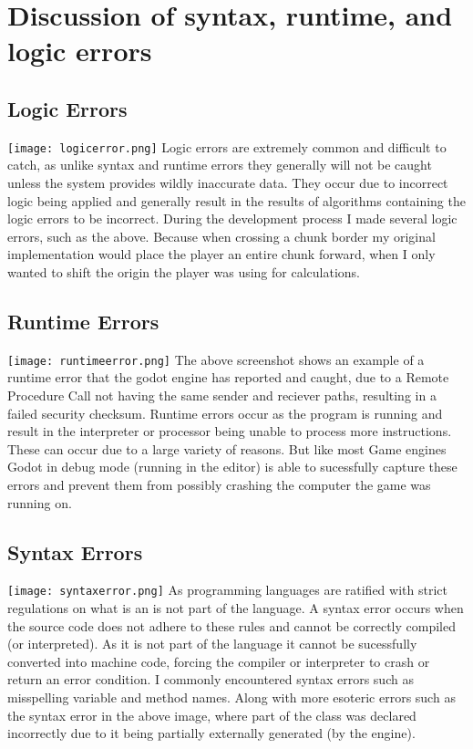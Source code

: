 \documentclass[12pt, DIV=calc]{scrartcl}
\begin{document}
\clearpage
\section{Discussion of syntax, runtime, and logic errors}
\subsection{Logic Errors}
\texttt{[image: logicerror.png]}
Logic errors are extremely common and difficult to catch, as unlike syntax and runtime errors they generally will not be caught unless the system provides wildly inaccurate data. They occur due to incorrect logic being applied and generally result in the results of algorithms containing the logic errors to be incorrect. During the development process I made several logic errors, such as the above. Because when crossing a chunk border my original implementation would place the player an entire chunk forward, when I only wanted to shift the origin the player was using for calculations.


\subsection{Runtime Errors}
\texttt{[image: runtimeerror.png]}
The above screenshot shows an example of a runtime error that the godot engine has reported and caught, due to a Remote Procedure Call not having the same sender and reciever paths, resulting in a failed security checksum. Runtime errors occur as the program is running and result in the interpreter or processor being unable to process more instructions. These can occur due to a large variety of reasons. But like most Game engines Godot in debug mode (running in the editor) is able to sucessfully capture these errors and prevent them from possibly crashing the computer the game was running on.

\subsection{Syntax Errors}
\texttt{[image: syntaxerror.png]}
As programming languages are ratified with strict regulations on what is an is not part of the language. A syntax error occurs when the source code does not adhere to these rules and cannot be correctly compiled (or interpreted). As it is not part of the language it cannot be sucessfully converted into machine code, forcing the compiler or interpreter to crash or return an error condition. I commonly encountered syntax errors such as misspelling variable and method names. Along with more esoteric errors such as the syntax error in the above image, where part of the class was declared incorrectly due to it being partially externally generated (by the engine). 
\end{document}
